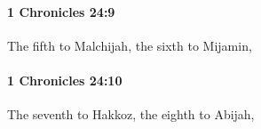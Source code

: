 		\paragraph{1 Chronicles 24:9} %
			\label{1CHRONICLES-24-9}

			The fifth to Malchijah, the sixth to Mijamin,


		\paragraph{1 Chronicles 24:10} %
			\label{1CHRONICLES-24-10}

			The seventh to Hakkoz, the eighth to Abijah,


